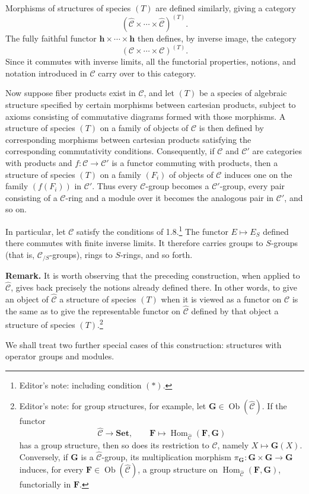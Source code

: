 Morphisms of structures of species \((T)\) are defined similarly, giving a
category
\[
  (\widehat{\mathscr C}\times\cdots\times\widehat{\mathscr C})^{(T)}.
\]
The fully faithful functor \(\mathbf h\times\cdots\times\mathbf h\) then
defines, by inverse image, the category
\[
  (\mathscr C\times\cdots\times\mathscr C)^{(T)}.
\]
Since it commutes with inverse limits, all the functorial properties,
notions, and notation introduced in \(\widehat{\mathscr C}\) carry over to
this category.

Now suppose fiber products exist in \(\mathscr C\), and let \((T)\) be a
species of algebraic structure specified by certain morphisms between
cartesian products, subject to axioms consisting of commutative diagrams
formed with those morphisms. A structure of species \((T)\) on a family of
objects of \(\mathscr C\) is then defined by corresponding morphisms between
cartesian products satisfying the corresponding commutativity conditions.
Consequently, if \(\mathscr C\) and \(\mathscr C'\) are categories with
products and \(f:\mathscr C\to\mathscr C'\) is a functor commuting with
products, then a structure of species \((T)\) on a family
\((F_i)\) of objects of \(\mathscr C\) induces one on the family
\((f(F_i))\) in \(\mathscr C'\). Thus every \(\mathscr C\)-group becomes a
\(\mathscr C'\)-group, every pair consisting of a \(\mathscr C\)-ring and a
module over it becomes the analogous pair in \(\mathscr C'\), and so on.

In particular, let \(\mathscr C\) satisfy the conditions of 1.8.\footnote{
Editor's note: including condition \((*)\).} The functor
\(E\mapsto E_S\) defined there commutes with finite inverse limits. It
therefore carries groups to \(S\)-groups (that is,
\(\mathscr C_{/S}\)-groups), rings to \(S\)-rings, and so forth.

\medskip
\noindent\textbf{Remark.}
It is worth observing that the preceding construction, when applied to
\(\widehat{\mathscr C}\), gives back precisely the notions already defined
there. In other words, to give an object of \(\widehat{\mathscr C}\) a
structure of species \((T)\) when it is viewed as a functor on
\(\mathscr C\) is the same as to give the representable functor on
\(\widehat{\mathscr C}\) defined by that object a structure of species
\((T)\).\footnote{Editor's note: for group structures, for example, let
\(\mathbf G\in\operatorname{Ob}(\widehat{\mathscr C})\). If the functor
\[
  \widehat{\mathscr C}\longrightarrow\mathbf{Set},
  \qquad
  \mathbf F\longmapsto
  \operatorname{Hom}_{\widehat{\mathscr C}}(\mathbf F,\mathbf G)
\]
has a group structure, then so does its restriction to \(\mathscr C\),
namely \(X\mapsto\mathbf G(X)\). Conversely, if \(\mathbf G\) is a
\(\widehat{\mathscr C}\)-group, its multiplication morphism
\(\pi_{\mathbf G}:\mathbf G\times\mathbf G\to\mathbf G\) induces, for every
\(\mathbf F\in\operatorname{Ob}(\widehat{\mathscr C})\), a group structure
on
\(\operatorname{Hom}_{\widehat{\mathscr C}}(\mathbf F,\mathbf G)\),
functorially in \(\mathbf F\).}

We shall treat two further special cases of this construction: structures
with operator groups and modules.

